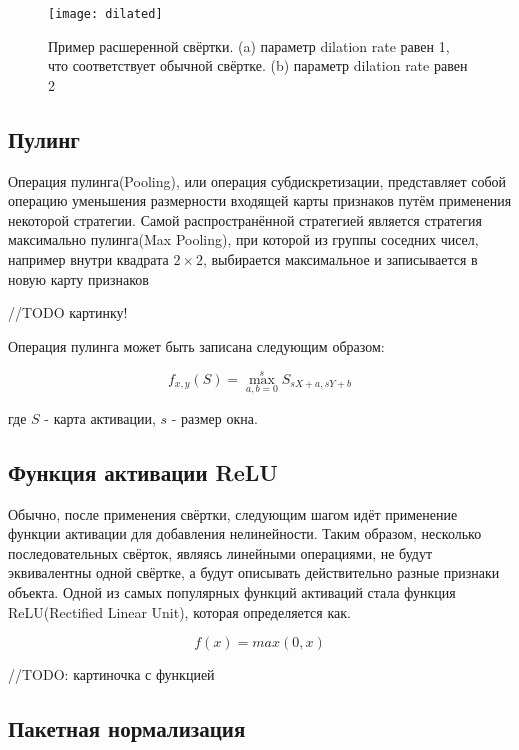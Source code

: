 \begin{figure}[h]
    \centering
    \texttt{[image: dilated]}
    \caption{Пример расшеренной свёртки.     (a) параметр dilation rate равен 1, что соответствует обычной свёртке. (b) параметр dilation rate равен 2}
    \label{fig:dilated}
\end{figure}


\subsection{Пулинг}

Операция пулинга(Pooling), или операция субдискретизации, представляет собой операцию уменьшения размерности входящей карты признаков 
путём применения некоторой стратегии. Самой распространённой стратегией является стратегия максимально пулинга(Max Pooling),
при которой из группы соседних чисел, например внутри квадрата $2 \times 2$, выбирается максимальное и записывается в новую
карту признаков 

//TODO картинку!

Операция пулинга может быть записана следующим образом:

\begin{equation}
    f_{x,y}(S) = \max_{a,b=0}^{s}S_{sX+a, sY+b}
\end{equation}

где $S$ - карта активации, $s$ - размер окна.

\subsection{Функция активации ReLU}

Обычно, после применения свёртки, следующим шагом идёт применение функции активации для добавления нелинейности. Таким образом,
несколько последовательных свёрток, являясь линейными операциями, не будут эквивалентны одной свёртке, а будут описывать действительно 
разные признаки объекта. Одной из самых популярных функций активаций стала функция ReLU(Rectified Linear Unit), которая определяется
как.

\begin{equation}
    f(x) = max(0,x)
\end{equation}

//TODO: картиночка с функцией


\subsection{Пакетная нормализация}

